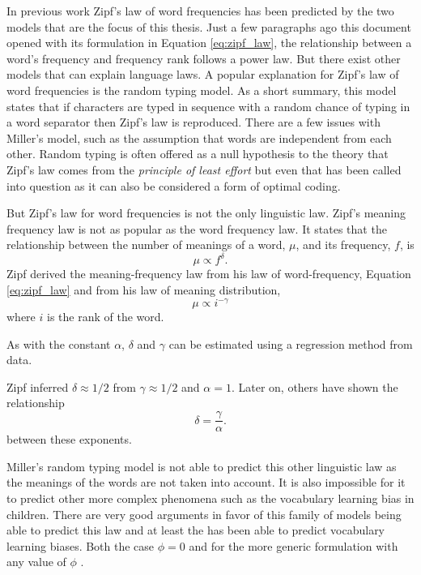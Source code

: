 
In previous work \cite{Ferrer2003a} \cite{Ferrer2005a} Zipf's law of word frequencies has been predicted by the two models that are the focus of this thesis.
Just a few paragraphs ago this document opened with its formulation in Equation \eqref{eq:zipf_law}, the relationship between a word's frequency and frequency rank follows a power law.
But there exist other models that can explain language laws.
A popular explanation for Zipf's law of word frequencies is the random typing model.\cite{Miller1963a}
As a short summary, this model states that if characters are typed in sequence with a random chance of typing in a word separator then Zipf's law is reproduced.
There are a few issues with Miller's model, such as the assumption that words are independent from each other.
Random typing is often offered as a null hypothesis to the theory that Zipf's law comes from the \emph{principle of least effort} but even that has been called into question as it can also be considered a form of optimal coding. \cite{Ferrer2020a}

But Zipf's law for word frequencies is not the only linguistic law.
Zipf's meaning frequency law is not as popular as the word frequency law.
It states that the relationship between the number of meanings of a word, $\mu$, and its frequency, $f$, is \cite{Zipf1949a}
\begin{equation*}
  \mu \propto f^\delta.
\end{equation*}
Zipf derived the meaning-frequency law from his law of word-frequency, Equation \eqref{eq:zipf_law} and from his law of meaning distribution,
\begin{equation*}
  \mu \propto i^{-\gamma}
\end{equation*}
where $i$ is the rank of the word.

As with the constant $\alpha$, $\delta$ and $\gamma$ can be estimated using a regression method from data.

Zipf inferred $\delta \approx 1/2$ from $\gamma \approx 1/2$ and $\alpha = 1$.
Later on, others \cite{Ferrer2016a} have shown the relationship
\begin{equation}
  \label{eq:relation-exponents}
  \delta = \frac{\gamma}{\alpha}.
\end{equation}
between these exponents.

Miller's random typing model is not able to predict this other linguistic law as the meanings of the words are not taken into account.
It is also impossible for it to predict other more complex phenomena such as the vocabulary learning bias in children.
There are very good arguments \cite{Ferrer2018a} in favor of this family of models being able to predict this law and at least the \firstmodel{} has been able to predict vocabulary learning biases.
Both the case $\phi=0$ \cite{Ferrer2017a} and for the more generic formulation with any value of $\phi$ \cite{Carrera2021a}.

